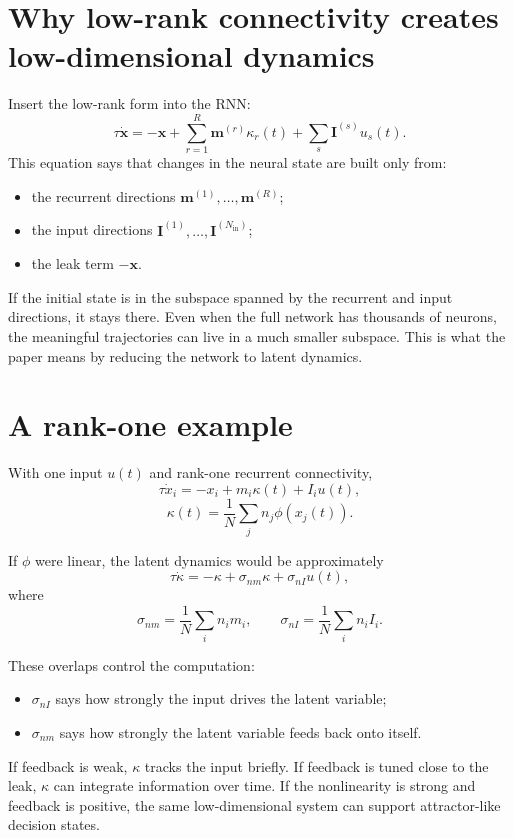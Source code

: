 \documentclass[11pt]{article}
\newcommand{\vx}{\mathbf{x}}
\newcommand{\vm}{\mathbf{m}}
\newcommand{\vI}{\mathbf{I}}
\begin{document}
\section{Why low-rank connectivity creates low-dimensional dynamics}

Insert the low-rank form into the RNN:
\begin{equation}
  \tau \dot{\vx}
  =
  -\vx
  +
  \sum_{r=1}^{R} \vm^{(r)}\kappa_r(t)
  +
  \sum_s \vI^{(s)}u_s(t).
  \label{eq:low_dim_state}
\end{equation}
This equation says that changes in the neural state are built only from:
\begin{itemize}
  \item the recurrent directions $\vm^{(1)},\ldots,\vm^{(R)}$;
  \item the input directions $\vI^{(1)},\ldots,\vI^{(N_{\mathrm{in}})}$;
  \item the leak term $-\vx$.
\end{itemize}

If the initial state is in the subspace spanned by the recurrent and input
directions, it stays there. Even when the full network has thousands of neurons,
the meaningful trajectories can live in a much smaller subspace. This is what the
paper means by reducing the network to latent dynamics.

\section{A rank-one example}

With one input $u(t)$ and rank-one recurrent connectivity,
\begin{equation}
  \tau \dot{x}_i
  =
  -x_i + m_i \kappa(t) + I_i u(t),
\end{equation}
\begin{equation}
  \kappa(t)
  =
  \frac{1}{N}
  \sum_j n_j \phi(x_j(t)).
\end{equation}

If $\phi$ were linear, the latent dynamics would be approximately
\begin{equation}
  \tau \dot{\kappa}
  =
  -\kappa
  +
  \sigma_{nm}\kappa
  +
  \sigma_{nI}u(t),
  \label{eq:linear_kappa}
\end{equation}
where
\begin{equation}
  \sigma_{nm} = \frac{1}{N}\sum_i n_i m_i,
  \qquad
  \sigma_{nI} = \frac{1}{N}\sum_i n_i I_i.
\end{equation}

These overlaps control the computation:
\begin{itemize}
  \item $\sigma_{nI}$ says how strongly the input drives the latent variable;
  \item $\sigma_{nm}$ says how strongly the latent variable feeds back onto itself.
\end{itemize}
If feedback is weak, $\kappa$ tracks the input briefly. If feedback is tuned close
to the leak, $\kappa$ can integrate information over time. If the nonlinearity is
strong and feedback is positive, the same low-dimensional system can support
attractor-like decision states.
\end{document}
